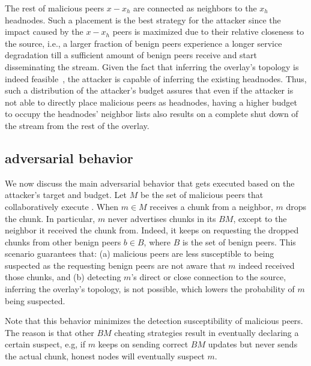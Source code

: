 The rest of malicious peers $x-x_h$ are connected as neighbors to the $x_h$ headnodes. 
Such a placement is the best strategy for the attacker since the impact caused by the $x-x_h$ peers is maximized due to their relative closeness to the source, i.e., a larger fraction of benign peers experience a longer service degradation till a sufficient amount of benign peers receive and start disseminating the stream.
Given the fact that inferring the overlay's topology is indeed feasible~\cite{nguyen2016swap,rbcs}, the attacker is capable of inferring the existing headnodes.
Thus, such a distribution of the attacker's budget assures that even if the attacker is not able to directly place malicious peers as headnodes, having a higher budget to occupy the headnodes' neighbor lists also results on a complete shut down of the stream from the rest of the overlay.



\subsection{\drop adversarial behavior}
We now discuss the main adversarial behavior that gets executed based on the attacker's target and budget. 
Let $M$ be the set of malicious peers that collaboratively execute \drop. 
When $m \in M$ receives a chunk from a neighbor, $m$ drops the chunk.
In particular, $m$ never advertises chunks in its $BM$, except to the neighbor it received the chunk from.
Indeed, it keeps on requesting the dropped chunks from other benign peers $b \in B$, where $B$ is the set of benign peers.
This scenario guarantees that: (a) malicious peers are less susceptible to being suspected as the requesting benign peers are not aware that $m$ indeed received those chunks,
and (b) detecting $m$'s direct or close connection to the source, inferring the overlay's topology, is not possible, which lowers the probability of $m$ being suspected.


Note that this behavior minimizes the detection susceptibility of malicious peers.
The reason is that other $BM$ cheating strategies result in eventually declaring a certain suspect, e.g, if $m$ keeps on sending correct $BM$ updates but never sends the actual chunk, honest nodes will eventually suspect $m$.


 





